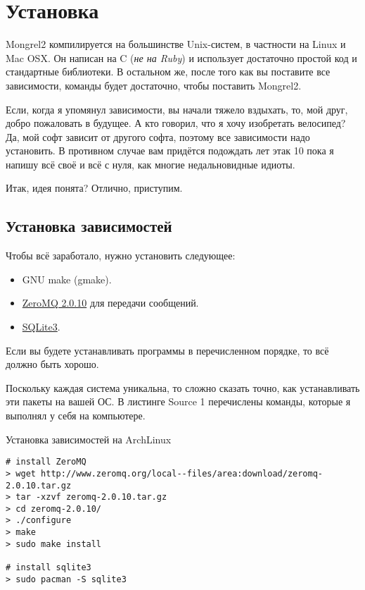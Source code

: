 \chapter{Установка}

Mongrel2 компилируется на большинстве Unix-систем, в частности на Linux и Mac OSX.
Он написан на C (\emph{не на Ruby}) и использует достаточно простой код и стандартные
библиотеки. В остальном же, после того как вы поставите все зависимости,
команды  будет достаточно, чтобы поставить Mongrel2.

Если, когда я упомянул зависимости, вы начали тяжело вздыхать, то, мой друг,
добро пожаловать в будущее. А кто говорил, что я хочу изобретать велосипед?
Да, мой софт зависит от другого софта, поэтому все зависимости надо установить.
В противном случае вам придётся подождать лет этак 10 пока я напишу всё своё
и всё с нуля, как многие недальновидные идиоты.

Итак, идея понята? Отлично, приступим.

\section{Установка зависимостей}

Чтобы всё заработало, нужно установить следующее:

\begin{itemize}
\item GNU make (gmake).
\item \href{http://zeromq.org}{ZeroMQ 2.0.10} для передачи сообщений.
\item \href{http://www.sqlite.org/}{SQLite3}.
\end{itemize}

Если вы будете устанавливать программы в перечисленном порядке, то всё должно быть хорошо.

Поскольку каждая система уникальна, то сложно сказать точно, как устанавливать
эти пакеты на вашей ОС. В листинге Source 1 перечислены команды, которые я
выполнял у себя на компьютере.

\begin{code}{Установка зависимостей на ArchLinux}
\begin{lstlisting}
# install ZeroMQ
> wget http://www.zeromq.org/local--files/area:download/zeromq-2.0.10.tar.gz
> tar -xzvf zeromq-2.0.10.tar.gz
> cd zeromq-2.0.10/
> ./configure
> make
> sudo make install

# install sqlite3
> sudo pacman -S sqlite3
\end{lstlisting}
\end{code}

